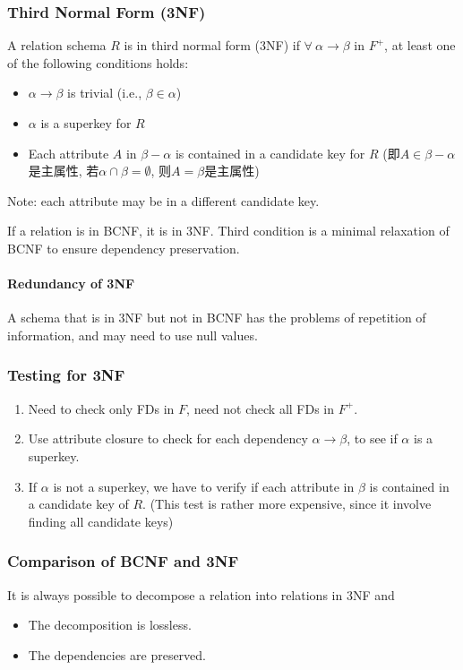 \subsubsection{Third Normal Form (3NF)}
\begin{definition}
    A relation schema $R$ is in third normal form (3NF) if $\forall\ \alpha \rightarrow \beta$ in $F^+$, at least one of the following conditions holds:
    \begin{itemize}\small
        \item $\alpha \rightarrow \beta$ is trivial (i.e., $\beta \in \alpha$)
        \item $\alpha$ is a superkey for $R$
        \item Each attribute $A$ in $\beta -\alpha$ is contained in a candidate key for $R$ (即$A\in \beta-\alpha$是主属性, 若$\alpha \cap \beta =\emptyset$, 则$A=\beta$是主属性)
    \end{itemize}
\end{definition}
Note: each attribute may be in a different candidate key.

If a relation is in BCNF, it is in 3NF. Third condition is a minimal relaxation of BCNF to ensure dependency preservation. 

\paragraph{Redundancy of 3NF}
A schema that is in 3NF but not in BCNF has the problems of repetition of information, and may need to use null values. 

\subsubsection{Testing for 3NF}
\begin{enumerate}
    \item  Need to check only FDs in $F$, need not check all FDs in $F^+$.
    \item Use attribute closure to check for each dependency $\alpha\rightarrow\beta$, to see if $\alpha$ is a superkey.
    \item If $\alpha$ is not a superkey, we have to verify if each attribute in $\beta$ is contained in a candidate key of $R$. (This test is rather more expensive, since it involve finding all candidate keys)
\end{enumerate}

\subsubsection{Comparison of BCNF and 3NF}
It is always possible to decompose a relation into relations in 3NF and
\begin{itemize}\small
    \item The decomposition is lossless.
    \item The dependencies are preserved.
\end{itemize}

